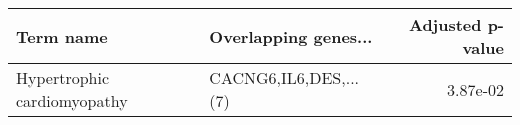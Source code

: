 \begin{tabular}{llr}
\toprule
                  Term name &  Overlapping genes... &  Adjusted p-value \\
\midrule
Hypertrophic cardiomyopathy & CACNG6,IL6,DES,...(7) &          3.87e-02 \\
\bottomrule
\end{tabular}
